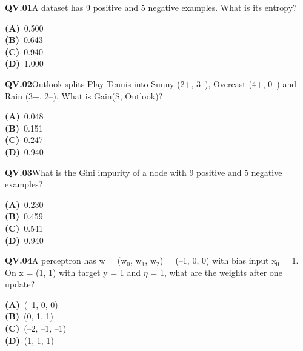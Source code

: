 \documentclass[11pt]{article}
\begin{document}
\newpage
{}
\begin{tcolorbox}[enhanced,breakable,colback=white,colframe=navyL,arc=2mm,boxrule=0.7pt,left=3mm,right=3mm,top=2mm,bottom=2mm]
\textbf{\color{navy}QV.01}\quad A dataset has 9 positive and 5 negative examples. What is its entropy?\hfill{}\par\smallskip
{\small \textbf{\color{navyL}(A)}\ 0.500\\[1pt]\textbf{\color{navyL}(B)}\ 0.643\\[1pt]\textbf{\color{navyL}(C)}\ 0.940\\[1pt]\textbf{\color{navyL}(D)}\ 1.000}
\end{tcolorbox}
\begin{tcolorbox}[enhanced,breakable,colback=white,colframe=navyL,arc=2mm,boxrule=0.7pt,left=3mm,right=3mm,top=2mm,bottom=2mm]
\textbf{\color{navy}QV.02}\quad Outlook splits Play Tennis into Sunny (2+, 3--), Overcast (4+, 0--) and Rain (3+, 2--). What is Gain(S, Outlook)?\hfill{}\par\smallskip
{\small \textbf{\color{navyL}(A)}\ 0.048\\[1pt]\textbf{\color{navyL}(B)}\ 0.151\\[1pt]\textbf{\color{navyL}(C)}\ 0.247\\[1pt]\textbf{\color{navyL}(D)}\ 0.940}
\end{tcolorbox}
\begin{tcolorbox}[enhanced,breakable,colback=white,colframe=navyL,arc=2mm,boxrule=0.7pt,left=3mm,right=3mm,top=2mm,bottom=2mm]
\textbf{\color{navy}QV.03}\quad What is the Gini impurity of a node with 9 positive and 5 negative examples?\hfill{}\par\smallskip
{\small \textbf{\color{navyL}(A)}\ 0.230\\[1pt]\textbf{\color{navyL}(B)}\ 0.459\\[1pt]\textbf{\color{navyL}(C)}\ 0.541\\[1pt]\textbf{\color{navyL}(D)}\ 0.940}
\end{tcolorbox}
\begin{tcolorbox}[enhanced,breakable,colback=white,colframe=navyL,arc=2mm,boxrule=0.7pt,left=3mm,right=3mm,top=2mm,bottom=2mm]
\textbf{\color{navy}QV.04}\quad A perceptron has w = (w$_0$, w$_1$, w$_2$) = (--1, 0, 0) with bias input x$_0$ = 1. On x = (1, 1) with target y = 1 and $\eta$ = 1, what are the weights after one update?\hfill{}\par\smallskip
{\small \textbf{\color{navyL}(A)}\ (--1, 0, 0)\\[1pt]\textbf{\color{navyL}(B)}\ (0, 1, 1)\\[1pt]\textbf{\color{navyL}(C)}\ (--2, --1, --1)\\[1pt]\textbf{\color{navyL}(D)}\ (1, 1, 1)}
\end{tcolorbox}
\end{document}
